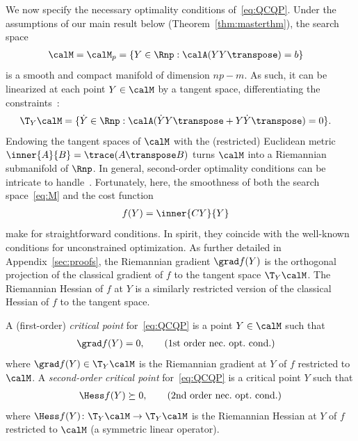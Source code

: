 \documentclass{article}
\newcommand{\1}{\mathbf{1}}
\begin{document}
We now specify the necessary optimality conditions of~\eqref{eq:QCQP}. Under the assumptions of our main result below (Theorem~\ref{thm:masterthm}), the search space
\begin{align}
\calM & = \calM_p = \{ Y \in \Rnp : \calA(YY\transpose) = b \}
\label{eq:M}
\end{align}
is a smooth and compact manifold of dimension $np - m$. As such, it can be linearized at each point $Y\in\calM$ by a tangent space, differentiating the constraints~\citep[eq.\,(3.19)]{AMS08}:
\begin{align}
	\T_Y\calM & = \{ \dot Y \in \Rnp : \calA(\dot Y Y\transpose + Y \dot Y\transpose) = 0 \}.
	\label{eq:TYM}
\end{align}
Endowing the tangent spaces of $\calM$ with the (restricted) Euclidean metric $\inner{A}{B} = \trace(A\transpose B)$ turns $\calM$ into a Riemannian submanifold of $\Rnp$.
%
In general, second-order optimality conditions can be intricate to handle~\citep{ruszczynski2006nonlinear}. Fortunately, here, the smoothness of both the search space~\eqref{eq:M} and the cost function
\begin{align}
	f(Y) & = \inner{CY}{Y}
	\label{eq:f}
\end{align}
make for straightforward conditions. In spirit, they coincide with the well-known conditions for unconstrained optimization.
As further detailed in Appendix~\ref{sec:proofs}, the Riemannian gradient $\grad f(Y)$ is the orthogonal projection of the classical gradient of $f$ to the tangent space $\T_Y\calM$. The Riemannian Hessian of $f$ at $Y$ is a similarly restricted version of the classical Hessian of $f$ to the tangent space.
\begin{definition}\label{def:criticalpts}
	A (first-order) \emph{critical point} for~\eqref{eq:QCQP} is a point $Y \in \calM$ such that
	\begin{align}
	\grad f(Y) & = 0,
	\tag{1st order nec.\ opt.\ cond.}
	\end{align}
	where $\grad f(Y) \in \T_Y\calM$ is the Riemannian gradient at $Y$ of
	$f$ restricted to $\calM$.
	A \emph{second-order critical point} for~\eqref{eq:QCQP} is a critical point $Y$ such that
	\begin{align}
	\Hess f(Y) \succeq 0,
	\tag{2nd order nec.\ opt.\ cond.}
	\end{align}
	where $\Hess f(Y) \colon \T_Y\calM \to \T_Y\calM$ is the Riemannian Hessian at $Y$ of $f$ restricted to $\calM$ (a symmetric linear operator).
\end{definition}
\end{document}
